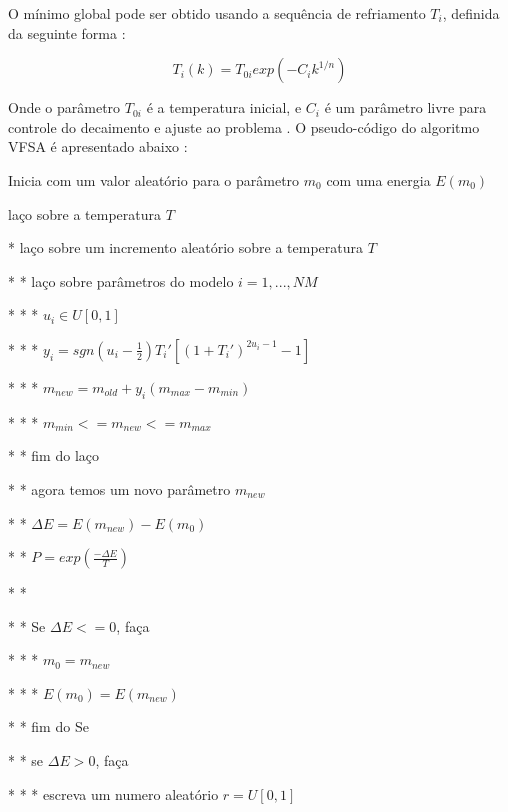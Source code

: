 O mínimo global pode ser obtido usando a sequência de refriamento $T_i$, definida da seguinte forma \cite{ingber}:

\begin{equation}
\label{eq:3.8}
 T_i(k)=T_{0i}exp(-C_ik^{1/n})
\end{equation}

Onde o parâmetro $T_{0i}$ é a temperatura inicial, e $C_i$ é um parâmetro livre para controle do decaimento e ajuste ao
problema \cite{klaus}. O pseudo-código do algoritmo VFSA é apresentado abaixo \cite{stoffa}:

\vspace{\onelineskip} 

\begin{algorithm}[H]
\caption{Como escrever algoritmos no \LaTeX2e}
\end{algorithm}

Inicia com um valor aleatório para o parâmetro $m_0$ com uma energia $E(m_0)$

laço sobre a temperatura $T$

* laço sobre um incremento aleatório sobre a temperatura $T$

* * laço sobre parâmetros do modelo $i=1,...,NM$

* * * $u_i \in U[0,1]$

* * * $y_i=sgn(u_i-\frac{1}{2})T_i'[(1+T_i')^{2u_i-1}-1]$

* * * $m_{new}=m_{old}+y_i(m_{max}-m_{min})$

* * * $m_{min}<=m_{new}<=m_{max}$

* * fim do laço

* * agora temos um novo parâmetro $m_{new}$

* * $\Delta E=E(m_{new})-E(m_0)$

* * $P=exp(\frac{-\Delta E}{T})$

* *

* * Se $\Delta E <= 0$, faça

* * * $m_0=m_{new}$

* * * $E(m_0)=E(m_{new})$

* * fim do Se

* * se $\Delta E > 0$, faça

* * * escreva um numero aleatório $r=U[0,1]$

